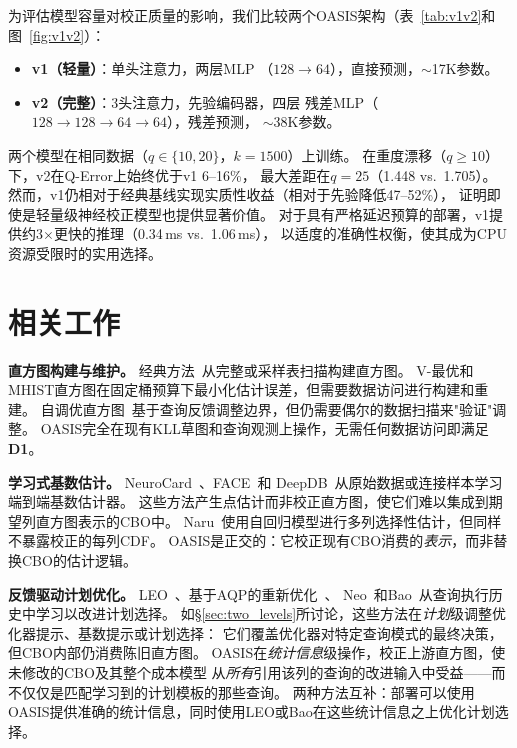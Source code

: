 \documentclass[runningheads]{llncs}
\begin{document}
为评估模型容量对校正质量的影响，我们比较两个OASIS架构（表~\ref{tab:v1v2}和图~\ref{fig:v1v2}）：
\begin{itemize}
  \item \textbf{v1（轻量）}：单头注意力，两层MLP
        （$128 \to 64$），直接预测，$\sim$17K参数。
  \item \textbf{v2（完整）}：3头注意力，先验编码器，四层
        残差MLP（$128 \to 128 \to 64 \to 64$），残差预测，
        $\sim$38K参数。
\end{itemize}

两个模型在相同数据（$q{\in}\{10,20\}$，$k{=}1500$）上训练。
在重度漂移（$q{\geq}10$）下，v2在Q-Error上始终优于v1 6--16\%，
最大差距在$q{=}25$（1.448 vs.\ 1.705）。
然而，v1仍相对于经典基线实现实质性收益（相对于先验降低47--52\%），
证明即使是轻量级神经校正模型也提供显著价值。
对于具有严格延迟预算的部署，v1提供约3$\times$更快的推理（0.34\,ms vs.\ 1.06\,ms），
以适度的准确性权衡，使其成为CPU资源受限时的实用选择。

\section{相关工作}
\label{sec:related}

\textbf{直方图构建与维护。}
经典方法~\cite{ioannidis1993histogram,poosala1997selectivity}从完整或采样表扫描构建直方图。
V-最优和MHIST直方图在固定桶预算下最小化估计误差，但需要数据访问进行构建和重建。
自调优直方图~\cite{aboulnaga1999self}基于查询反馈调整边界，但仍需要偶尔的数据扫描来"验证"调整。
OASIS完全在现有KLL草图和查询观测上操作，无需任何数据访问即满足\textbf{D1}。

\textbf{学习式基数估计。}
NeuroCard~\cite{yang2020neurocard}、FACE~\cite{yang2020face}和
DeepDB~\cite{hilprecht2019deepdb}从原始数据或连接样本学习端到端基数估计器。
这些方法产生点估计而非校正直方图，使它们难以集成到期望列直方图表示的CBO中。
Naru~\cite{yang2019deep}使用自回归模型进行多列选择性估计，但同样不暴露校正的每列CDF。
OASIS是正交的：它校正现有CBO消费的\emph{表示}，而非替换CBO的估计逻辑。

\textbf{反馈驱动计划优化。}
LEO~\cite{stillger2001leo}、基于AQP的重新优化~\cite{kabra1998efficient}、
Neo~\cite{marcus2019neo}和Bao~\cite{marcus2022bao}从查询执行历史中学习以改进计划选择。
如\S\ref{sec:two_levels}所讨论，这些方法在\emph{计划}级调整优化器提示、基数提示或计划选择：
它们覆盖优化器对特定查询模式的最终决策，但CBO内部仍消费陈旧直方图。
OASIS在\emph{统计信息}级操作，校正上游直方图，使未修改的CBO及其整个成本模型
从\emph{所有}引用该列的查询的改进输入中受益——而不仅仅是匹配学习到的计划模板的那些查询。
两种方法互补：部署可以使用OASIS提供准确的统计信息，同时使用LEO或Bao在这些统计信息之上优化计划选择。
\end{document}
